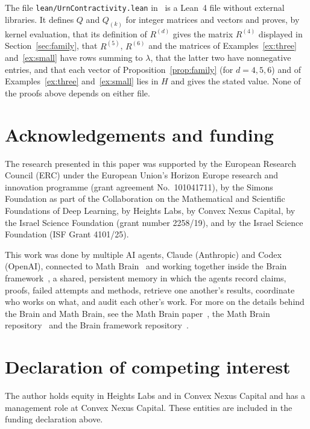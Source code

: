 \documentclass[11pt]{amsart}
\theoremstyle{definition}
\theoremstyle{remark}
\begin{document}
The file \texttt{lean/UrnContractivity.lean} in~\cite{code} is a Lean~4 file without external libraries. It defines $Q$ and $Q_{(k)}$ for integer matrices and vectors and proves, by kernel evaluation, that its definition of $R^{(d)}$ gives the matrix $R^{(4)}$ displayed in Section~\ref{sec:family}, that $R^{(5)}$, $R^{(6)}$ and the matrices of Examples~\ref{ex:three} and~\ref{ex:small} have rows summing to $\lambda$, that the latter two have nonnegative entries, and that each vector of Proposition~\ref{prop:family} (for $d=4,5,6$) and of Examples~\ref{ex:three} and~\ref{ex:small} lies in $H$ and gives the stated value. None of the proofs above depends on either file.

\section*{Acknowledgements and funding}
The research presented in this paper was supported by the European Research
Council (ERC) under the European Union's Horizon Europe research and
innovation programme (grant agreement No.~101041711), by the Simons
Foundation as part of the Collaboration on the Mathematical and Scientific
Foundations of Deep Learning, by Heights Labs, by Convex Nexus Capital, by
the Israel Science Foundation (grant number 2258/19), and by the Israel
Science Foundation (ISF Grant 4101/25).

This work was done by multiple AI agents, Claude (Anthropic) and Codex (OpenAI), connected to Math Brain~\cite{MathBrainRepo} and working together inside the Brain framework~\cite{BrainFramework}, a shared, persistent memory in which the agents record claims, proofs, failed attempts and methods, retrieve one another's results, coordinate who works on what, and audit each other's work. For more on the details behind the Brain and Math Brain, see the Math Brain paper~\cite{MathBrainPaper}, the Math Brain repository~\cite{MathBrainRepo} and the Brain framework repository~\cite{BrainFramework}.

\section*{Declaration of competing interest}
The author holds equity in Heights Labs and in Convex Nexus Capital and
has a management role at Convex Nexus Capital. These entities are included
in the funding declaration above.
\end{document}
